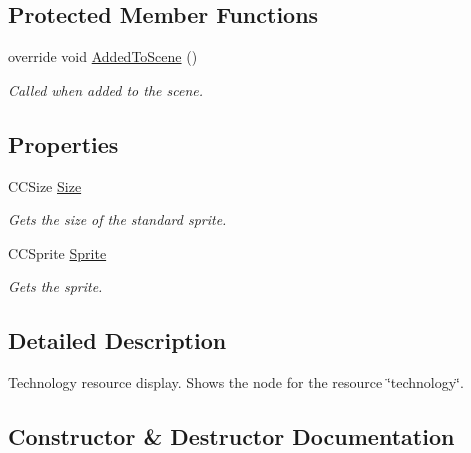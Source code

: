 \subsection*{Protected Member Functions}
\begin{DoxyCompactItemize}
\item 
override void \hyperlink{classClient_1_1Common_1_1Views_1_1HUD_1_1TechnologyResource_a5668eea0a032a62c1de7aa77aeb0b21e}{Added\+To\+Scene} ()
\begin{DoxyCompactList}\small\item\em Called when added to the scene. \end{DoxyCompactList}\end{DoxyCompactItemize}
\subsection*{Properties}
\begin{DoxyCompactItemize}
\item 
C\+C\+Size \hyperlink{classClient_1_1Common_1_1Views_1_1HUD_1_1TechnologyResource_a5ddcf3c0dcb4adef2c329761c0e82123}{Size}
\begin{DoxyCompactList}\small\item\em Gets the size of the standard sprite. \end{DoxyCompactList}\item 
C\+C\+Sprite \hyperlink{classClient_1_1Common_1_1Views_1_1HUD_1_1TechnologyResource_a8d4f66dd350c06badddce45977b55049}{Sprite}
\begin{DoxyCompactList}\small\item\em Gets the sprite. \end{DoxyCompactList}\end{DoxyCompactItemize}


\subsection{Detailed Description}
Technology resource display. Shows the node for the resource \char`\"{}technology\char`\"{}. 



\subsection{Constructor \& Destructor Documentation}
\hypertarget{classClient_1_1Common_1_1Views_1_1HUD_1_1TechnologyResource_af81c7df0c2922894977e8c8c93cf697c}{}
